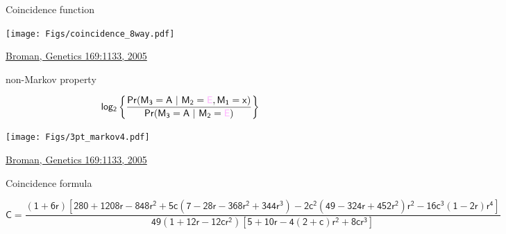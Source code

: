 \documentclass[12pt]{article}
\newcommand{\citesize}{\fontsize{14}{18} \selectfont}
\newcommand{\headsize}{\fontsize{35}{35} \selectfont}
\newcommand{\smallsize}{\fontsize{25}{30} \selectfont}
\newcommand{\supersmall}{\fontsize{16}{18} \selectfont}
\begin{document}
\headsize \color{myyellow}
\hfill \begin{minipage}{5.75in}
\centering
Coincidence function
\end{minipage}

\vspace{15mm}

\centerline{\texttt{[image: Figs/coincidence\_8way.pdf]}}

\vfill

\hfill {\citesize \color{citecolor} \href{http://www.genetics.org/content/169/2/1133.full}{Broman, Genetics
169:1133, 2005}}

\vspace*{5mm}

\newpage


\headsize \color{myyellow}
\hfill \begin{minipage}{5.75in}
\centering
{\color{mypink} non-}Markov property
\end{minipage}

\vspace{15mm}

\color{myblue} \smallsize
$$ \mathsf{log_2 \left\{ \frac{
    Pr(M_3 = A \ | \ M_2 = {\color{mypink} E}, M_1 = x)}{
    Pr(M_3 = A \ | \ M_2 = {\color{mypink} E})}\right\}}$$

\centerline{\texttt{[image: Figs/3pt\_markov4.pdf]}}

\vfill

\hfill {\citesize \color{citecolor} \href{http://www.genetics.org/content/169/2/1133.full}{Broman, Genetics
169:1133, 2005}}

\vspace*{5mm}

\newpage


\headsize \color{myyellow}
\hfill \begin{minipage}{5.75in}
\centering
Coincidence formula
\end{minipage}

\vspace{5cm}

\supersmall \color{mywhite}

$$ \mathsf{C = \frac{(1+6r)[280 + 1208r - 848r^2 + 5c(7-28r - 368r^2 + 344r^3)
  - 2c^2(49 - 324r + 452r^2)r^2 - 16c^3(1-2r)r^4]}{49 (1+12r-12cr^2)
    [5+10r-4(2+c)r^2+8cr^3]} }$$
\end{document}
